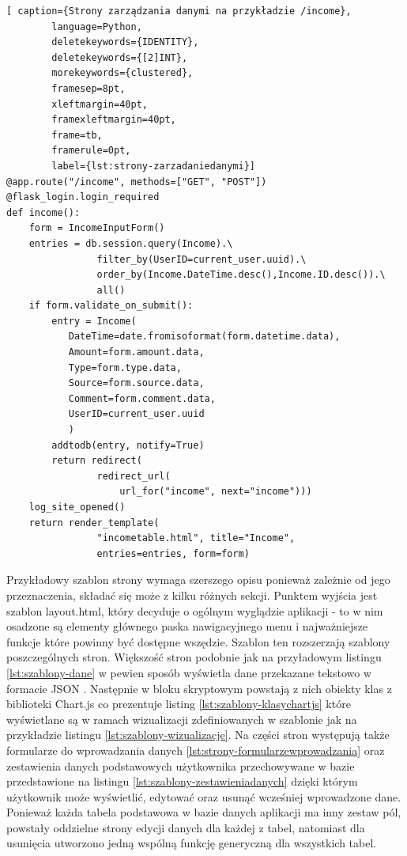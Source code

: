 \documentclass[a4paper, 10pt, twoside, openright]{report}
\begin{document}
\begin{large}
\begin{minipage}{\textwidth}
    \begin{lstlisting}[ caption={Strony zarządzania danymi na przykładzie /income},
        language=Python,
        deletekeywords={IDENTITY},
        deletekeywords={[2]INT},
        morekeywords={clustered},
        framesep=8pt,
        xleftmargin=40pt,
        framexleftmargin=40pt,
        frame=tb,
        framerule=0pt,
        label={lst:strony-zarzadaniedanymi}]
@app.route("/income", methods=["GET", "POST"])
@flask_login.login_required
def income():
    form = IncomeInputForm()
    entries = db.session.query(Income).\
                filter_by(UserID=current_user.uuid).\
                order_by(Income.DateTime.desc(),Income.ID.desc()).\
                all()
    if form.validate_on_submit():
        entry = Income(
           DateTime=date.fromisoformat(form.datetime.data),
           Amount=form.amount.data,
           Type=form.type.data,
           Source=form.source.data,
           Comment=form.comment.data,
           UserID=current_user.uuid
           )
        addtodb(entry, notify=True)
        return redirect(
                redirect_url(
                    url_for("income", next="income")))
    log_site_opened()
    return render_template(
                "incometable.html", title="Income",
                entries=entries, form=form)\end{lstlisting}
\end{minipage}

{Przykładowy szablon strony wymaga szerszego opisu ponieważ zależnie od jego 
przeznaczenia, składać się może z kilku różnych sekcji. Punktem wyjścia jest 
szablon layout.html, który decyduje o ogólnym wyglądzie aplikacji - to w nim 
osadzone są elementy głównego paska nawigacyjnego menu i najważniejsze funkcje 
które powinny być dostępne wszędzie. Szablon ten rozszerzają szablony 
poszczególnych stron. Większość stron podobnie jak na przyładowym listingu 
\ref*{lst:szablony-dane} w pewien sposób wyświetla dane przekazane tekstowo w 
formacie JSON \cite{JSON}. Następnie w bloku skryptowym powstają z nich obiekty 
klas z biblioteki Chart.js \cite{chart.js} co prezentuje listing 
\ref*{lst:szablony-klasychartjs} które wyświetlane są w ramach wizualizacji 
zdefiniowanych w szablonie jak na przykładzie listingu 
\ref*{lst:szablony-wizualizacje}. Na części stron występują także formularze do 
wprowadzania danych \ref*{lst:strony-formularzewprowadzania} oraz zestawienia 
danych podstawowych użytkownika przechowywane w bazie przedstawione na listingu 
\ref*{lst:szablony-zestawieniadanych} dzięki którym użytkownik może wyświetlić, 
edytować oraz usunąć wcześniej wprowadzone dane. Ponieważ każda tabela 
podstawowa w bazie danych aplikacji ma inny zestaw pól, powstały oddzielne 
strony edycji danych dla każdej z tabel, natomiast dla usunięcia utworzono 
jedną wspólną funkcję generyczną dla wszystkich tabel.}


\end{large}
\end{document}
